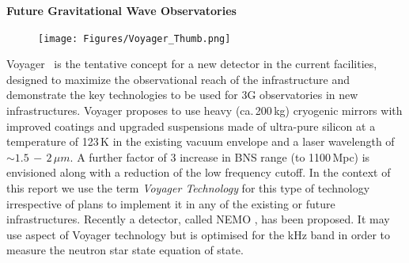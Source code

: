 \begin{DetBox}{\bf Future Gravitational Wave Observatories}
\begin{tcolorbox}[standard jigsaw,colframe=azure!70!black,colback=azure!20!white,opacityback=0.6,coltext=black, size=small, title=Voyager]
\begin{figure}
\vspace{-10pt}
\texttt{[image: Figures/Voyager\_Thumb.png]}
\label{fig:Voyager_Thumb}
\vspace{-20pt}
\end{figure}

Voyager~\cite{Voyager:Inst,VoyagerDCC2018, VoyagerDCC2019} is the tentative concept for a new detector in the current facilities, designed to maximize the observational reach of the infrastructure and demonstrate the key technologies to be used for \ac{3G} observatories in new infrastructures.
Voyager proposes to use heavy (ca.\,200\,kg) cryogenic mirrors with improved coatings and upgraded suspensions made of ultra-pure silicon at a temperature of 123\,K in the existing vacuum envelope and a laser wavelength of $\sim1.5\,-\,2\,\mu m$. 
A further factor of 3 increase in BNS range (to 1100\,Mpc) is envisioned along with a reduction of the low frequency cutoff. %
 In the context of this report we use the term \emph{Voyager Technology} for this type of technology irrespective of plans to implement it in any of the existing or future infrastructures.  Recently a detector, called \ac{NEMO} \cite{NEMO2020}, has been proposed. It  may use aspect of  Voyager technology but is optimised for the kHz band in order to measure the neutron star state equation of state. 
\end{tcolorbox}

\end{DetBox}


\newpage

